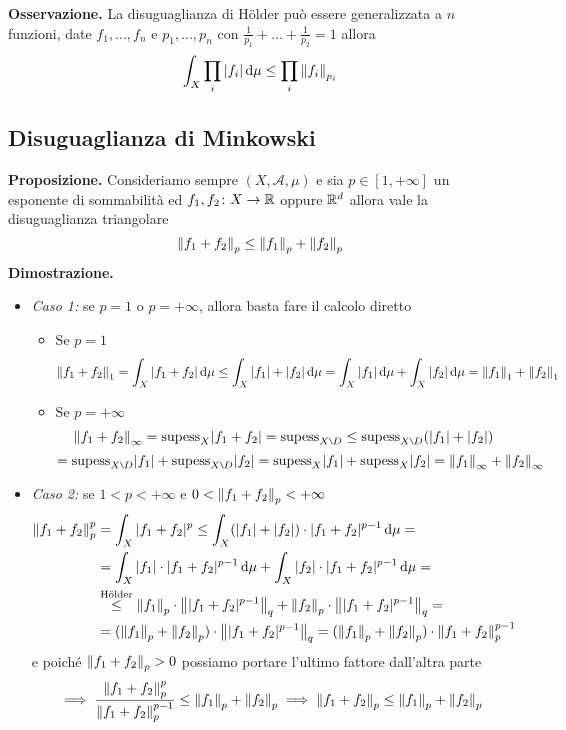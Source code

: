 \documentclass[a4paper, 12pt]{report}
\begin{document}
\textbf{Osservazione.}
La disuguaglianza di H\"older può essere generalizzata a $n$ funzioni, date $f_1, \dots, f_n$ e $p_1, \dots, p_n$ con $\frac{1}{p_1} + \dots + \frac{1}{p_2} = 1$ allora
$$
\int_X \prod_i |f_i| \,\mathrm{d} \mu \leq \prod_i \left\lVert f_i \right\rVert_{p_i} 
$$

\subsection{Disuguaglianza di Minkowski}

\textbf{Proposizione.} 
Consideriamo sempre $(X, \mathcal A, \mu)$ e sia $p \in [1, +\infty]$ un esponente di sommabilità ed $f_1, f_2 \colon X \to \mathbb R$ oppure $\mathbb R^d$ allora vale la disuguaglianza triangolare
$$
\left\lVert f_1 + f_2 \right\rVert_p \leq \left\lVert f_1 \right\rVert_p + \left\lVert f_2 \right\rVert_p
$$
%
\textbf{Dimostrazione.}
\begin{itemize}
	\item \textit{Caso 1:} se $p = 1$ o $p = +\infty$, allora basta fare il calcolo diretto
		
		\begin{itemize}
			\item Se $p = 1$
				$$
				\left\lVert f_1 + f_2 \right\rVert_1 
				= \int_X |f_1 + f_2| \,\mathrm{d} \mu 
				\leq \int_X |f_1| + |f_2| \,\mathrm{d} \mu 
				= \int_X |f_1| \,\mathrm{d} \mu + \int_X |f_2| \,\mathrm{d} \mu
				= \left\lVert f_1 \right\rVert_1 + \left\lVert f_2 \right\rVert_1
				$$
			\item Se $p = +\infty$
				$$
				\norm{f_1 + f_2}_\infty
				= \mathrm{supess}_X |f_1 + f_2| 
				= \mathrm{supess}_{X \setminus D} 
				\leq \mathrm{supess}_{X \setminus D} (|f_1| + |f_2|)
				$$
				$$
				= \mathrm{supess}_{X \setminus D} |f_1| + \mathrm{supess}_{X \setminus D} |f_2|
				= \mathrm{supess}_X |f_1| + \mathrm{supess}_X |f_2|
				= \norm{f_1}_\infty + \norm{f_2}_\infty
				$$
		\end{itemize}

	\item \textit{Caso 2:} se $1 < p < +\infty$ e $0 < \left\lVert f_1 + f_2 \right\rVert_p < +\infty$
		$$
		\begin{aligned}
			\left\lVert f_1 + f_2 \right\rVert_p^p 
			&= \int_X |f_1 + f_2|^p 
			\leq \int_X (|f_1| + |f_2|) \cdot |f_1 + f_2|^{p-1} \,\mathrm{d} \mu = \\
			&= \int_X |f_1| \cdot |f_1 + f_2|^{p-1} \,\mathrm{d} \mu + \int_X |f_2| \cdot |f_1 + f_2|^{p-1} \,\mathrm{d} \mu = \\
			&\overset{\text{H\"older}}{\leq} \left\lVert f_1 \right\rVert_p \cdot \left\lVert |f_1 + f_2|^{p-1} \right\rVert_q + \left\lVert f_2 \right\rVert_p \cdot \left\lVert |f_1 + f_2|^{p-1} \right\rVert_q = \\
			& = (\left\lVert f_1 \right\rVert_p + \left\lVert f_2 \right\rVert_p) \cdot \left\lVert |f_1 + f_2|^{p-1} \right\rVert_q 
			= (\left\lVert f_1 \right\rVert_p + \left\lVert f_2 \right\rVert_p) \cdot \left\lVert f_1 + f_2 \right\rVert_p^{p-1}  \\
		\end{aligned}
		$$
		e poiché $\left\lVert f_1 + f_2 \right\rVert_p > 0$ possiamo portare l'ultimo fattore dall'altra parte
		$$
		\implies \frac{\left\lVert f_1 + f_2 \right\rVert_p^p }{\left\lVert f_1 + f_2 \right\rVert_p^{p-1}} \leq \left\lVert f_1 \right\rVert_p + \left\lVert f_2 \right\rVert_p
		\implies \left\lVert f_1 + f_2 \right\rVert_p \leq \left\lVert f_1 \right\rVert_p + \left\lVert f_2 \right\rVert_p
		$$


\end{itemize}
\end{document}
